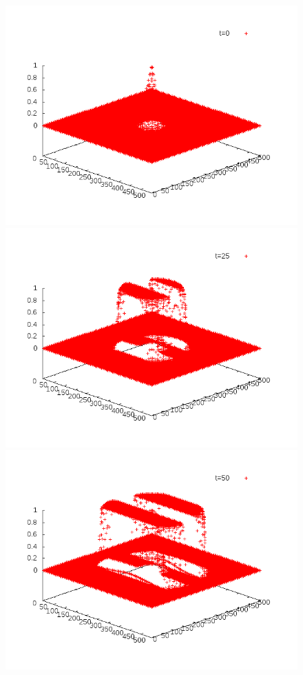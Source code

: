 \documentclass{article}
\begin{document}
\begin{figure}[!h]
\centering
	\includegraphics[scale=0.25]{img/anim1-80-1.png}
	\includegraphics[scale=0.25]{img/anim1-80-50.png}\\
	\includegraphics[scale=0.25]{img/anim1-80-100.png}

\end{figure}
\end{document}

